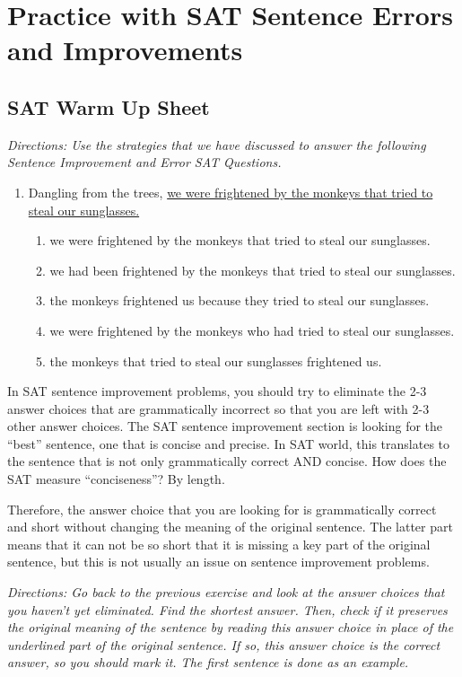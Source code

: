 \section{Practice with SAT Sentence Errors and Improvements}

\subsection{SAT Warm Up Sheet}

\textit{Directions: Use the strategies that we have discussed to answer the following Sentence Improvement and Error SAT Questions.}

\begin{enumerate}
\item Dangling from the trees, \ul{we were frightened by the monkeys that tried to steal our sunglasses.}

\begin{enumerate}[label=(\Alph*)]
\item we were frightened by the monkeys that tried to steal our sunglasses.
\item we had been frightened by the monkeys that tried to steal our sunglasses.
\item the monkeys frightened us because they tried to steal our sunglasses.
\item we were frightened by the monkeys who had tried to steal our sunglasses.
\item the monkeys that tried to steal our sunglasses frightened us. 
\end{enumerate}
\end{enumerate}

In SAT sentence improvement problems, you should try to eliminate the 2-3 answer choices that are grammatically incorrect so that you are left with 2-3 other answer choices. The SAT sentence improvement section is looking for the ``best'' sentence, one that is concise and precise. In SAT world, this translates to the sentence that is not only grammatically correct AND concise. How does the SAT measure ``conciseness''? By length.

\bigskip
Therefore, the answer choice that you are looking for is grammatically correct and short without changing the meaning of the original sentence. The latter part means that it can not be so short that it is missing a key part of the original sentence,
but this is not usually an issue on sentence improvement problems.

\bigskip
\textit{Directions: Go back to the previous exercise and look at the answer choices that you haven't yet eliminated. Find the shortest answer. Then, check if it preserves the original meaning of the sentence by reading this answer choice in place of the underlined part of the original sentence. If so, this answer choice is the correct answer, so you should mark it. The first sentence is done as an example.}

